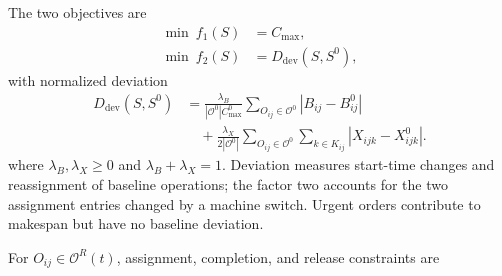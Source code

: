 The two objectives are
\begin{equation}
 \begin{aligned}
 \min\ f_1(S)&=C_{\max},\\
 \min\ f_2(S)&=D_{\mathrm{dev}}(S,S^0),
 \end{aligned}
 \label{eq:scheduling_objectives}
\end{equation}
with normalized deviation
\begin{equation}
 \begin{aligned}
 D_{\mathrm{dev}}(S,S^0)
 &=\frac{\lambda_B}{|\mathcal O^0|C^0_{\max}}
 \sum_{O_{ij}\in\mathcal O^0}|B_{ij}-B^0_{ij}|\\
 &\quad+\frac{\lambda_X}{2|\mathcal O^0|}
 \sum_{O_{ij}\in\mathcal O^0}\sum_{k\in K_{ij}}|X_{ijk}-X^0_{ijk}|.
 \end{aligned}
 \label{eq:objective_deviation}
\end{equation}
where $\lambda_B,\lambda_X\ge0$ and $\lambda_B+\lambda_X=1$. Deviation measures start-time changes
and reassignment of baseline operations; the factor two accounts for the two assignment entries changed by a machine switch.
Urgent orders contribute to makespan but have no baseline deviation.


For $O_{ij}\in\mathcal O^R(t)$, assignment, completion, and release constraints are


